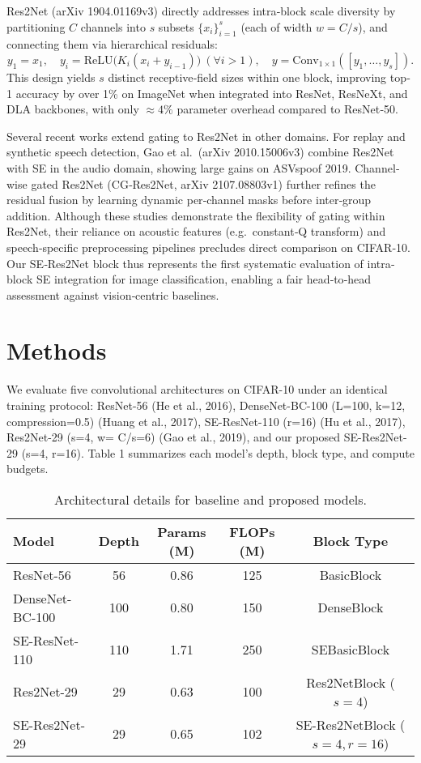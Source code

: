 \documentclass{article}
\begin{document}
Res2Net (arXiv 1904.01169v3) directly addresses intra‐block scale diversity by partitioning \(C\) channels into \(s\) subsets \(\{x_i\}_{i=1}^s\) (each of width \(w=C/s\)), and connecting them via hierarchical residuals:
\[
y_1 = x_1,\quad y_i = \mathrm{ReLU}\bigl(K_i(x_i + y_{i-1})\bigr)\ (\forall i>1),\quad y = \mathrm{Conv}_{1\times1}([y_1,\dots,y_s]).
\]
This design yields \(s\) distinct receptive‐field sizes within one block, improving top‐1 accuracy by over 1\% on ImageNet when integrated into ResNet, ResNeXt, and DLA backbones, with only \(\approx4\%\) parameter overhead compared to ResNet‐50.

Several recent works extend gating to Res2Net in other domains.  For replay and synthetic speech detection, Gao et al.\ (arXiv 2010.15006v3) combine Res2Net with SE in the audio domain, showing large gains on ASVspoof 2019.  Channel‐wise gated Res2Net (CG‐Res2Net, arXiv 2107.08803v1) further refines the residual fusion by learning dynamic per‐channel masks before inter‐group addition.  Although these studies demonstrate the flexibility of gating within Res2Net, their reliance on acoustic features (e.g.\ constant‐Q transform) and speech‐specific preprocessing pipelines precludes direct comparison on CIFAR‐10.  Our SE‐Res2Net block thus represents the first systematic evaluation of intra‐block SE integration for image classification, enabling a fair head‐to‐head assessment against vision‐centric baselines.

\section{Methods}
We evaluate five convolutional architectures on CIFAR-10 under an identical training protocol: ResNet-56 (He et al., 2016), DenseNet-BC-100 (L=100, k=12, compression=0.5) (Huang et al., 2017), SE-ResNet-110 (r=16) (Hu et al., 2017), Res2Net-29 (s=4, w= C/s=6) (Gao et al., 2019), and our proposed SE-Res2Net-29 (s=4, r=16).  Table 1 summarizes each model’s depth, block type, and compute budgets.  
\begin{table}[h]
\centering
\begin{tabular}{lcccc}
\toprule
Model             & Depth & Params (M) & FLOPs (M) & Block Type \\
\midrule
ResNet-56         & 56    & 0.86       & 125       & BasicBlock \\
DenseNet-BC-100   & 100   & 0.80       & 150       & DenseBlock \\
SE-ResNet-110     & 110   & 1.71       & 250       & SEBasicBlock \\
Res2Net-29        & 29    & 0.63       & 100       & Res2NetBlock ($s=4$) \\
SE-Res2Net-29     & 29    & 0.65       & 102       & SE-Res2NetBlock ($s=4,r=16$) \\
\bottomrule
\end{tabular}
\caption*{Architectural details for baseline and proposed models.}
\end{table}
\end{document}
